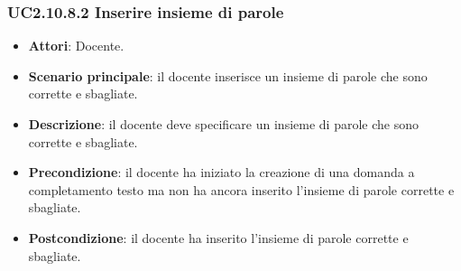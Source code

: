 \subsubsection{UC2.10.8.2 Inserire insieme di parole}
\begin{itemize}
\item \textbf{Attori}: Docente.
\item \textbf{Scenario principale}: il docente inserisce un insieme di parole che sono corrette e sbagliate.
\item \textbf{Descrizione}: il docente deve specificare un insieme di parole che sono corrette e sbagliate.
\item \textbf{Precondizione}:  il docente ha iniziato la creazione di una domanda a completamento testo ma non ha ancora inserito l'insieme di parole corrette e sbagliate.
\item \textbf{Postcondizione}: il docente ha inserito l'insieme di parole corrette e sbagliate.
\end{itemize}
